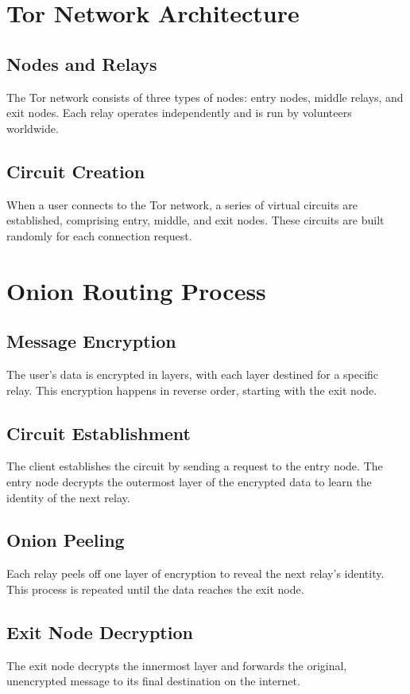 \documentclass{article}
\begin{document}
\section{Tor Network Architecture}
\subsection{Nodes and Relays}
The Tor network consists of three types of nodes: entry nodes, middle relays, and exit nodes. Each relay operates independently and is run by volunteers worldwide.

\subsection{Circuit Creation}
When a user connects to the Tor network, a series of virtual circuits are established, comprising entry, middle, and exit nodes. These circuits are built randomly for each connection request.

\section{Onion Routing Process}
\subsection{Message Encryption}
The user's data is encrypted in layers, with each layer destined for a specific relay. This encryption happens in reverse order, starting with the exit node.

\subsection{Circuit Establishment}
The client establishes the circuit by sending a request to the entry node. The entry node decrypts the outermost layer of the encrypted data to learn the identity of the next relay.

\subsection{Onion Peeling}
Each relay peels off one layer of encryption to reveal the next relay's identity. This process is repeated until the data reaches the exit node.

\subsection{Exit Node Decryption}
The exit node decrypts the innermost layer and forwards the original, unencrypted message to its final destination on the internet.
\end{document}
